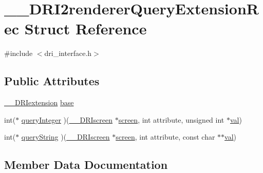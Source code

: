 \hypertarget{struct_____d_r_i2renderer_query_extension_rec}{}\section{\+\_\+\+\_\+\+D\+R\+I2renderer\+Query\+Extension\+Rec Struct Reference}
\label{struct_____d_r_i2renderer_query_extension_rec}


{\ttfamily \#include $<$dri\+\_\+interface.\+h$>$}

\subsection*{Public Attributes}
\begin{DoxyCompactItemize}
\item 
\hyperlink{dri__interface_8h_a4e0a61c8ece00d2b2c6792a9a1b55385}{\+\_\+\+\_\+\+D\+R\+Iextension} \hyperlink{struct_____d_r_i2renderer_query_extension_rec_a2e7d5418b29830ea3dd47f2ba46aed96}{base}
\item 
int($\ast$ \hyperlink{struct_____d_r_i2renderer_query_extension_rec_a17378509e2f471d61a2dbdb47d9eb185}{query\+Integer} )(\hyperlink{dri__interface_8h_a9961b01d421ee1fd6ed3c05acc9ca561}{\+\_\+\+\_\+\+D\+R\+Iscreen} $\ast$\hyperlink{cad_8h_ae04e09e4e3831bfc1632c509ae37dcec}{screen}, int attribute, unsigned int $\ast$\hyperlink{glcorearb_8h_a26942fd2ed566ef553eae82d2c109c8f}{val})
\item 
int($\ast$ \hyperlink{struct_____d_r_i2renderer_query_extension_rec_a353801b3ff0c1566da07251949c7dc78}{query\+String} )(\hyperlink{dri__interface_8h_a9961b01d421ee1fd6ed3c05acc9ca561}{\+\_\+\+\_\+\+D\+R\+Iscreen} $\ast$\hyperlink{cad_8h_ae04e09e4e3831bfc1632c509ae37dcec}{screen}, int attribute, const char $\ast$$\ast$\hyperlink{glcorearb_8h_a26942fd2ed566ef553eae82d2c109c8f}{val})
\end{DoxyCompactItemize}


\subsection{Member Data Documentation}
\mbox{\label{struct_____d_r_i2renderer_query_extension_rec_a2e7d5418b29830ea3dd47f2ba46aed96}} 
